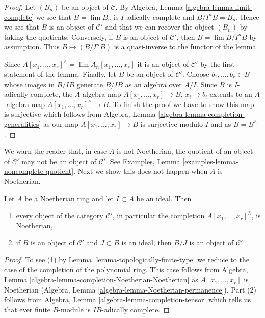 \begin{proof}
Let $(B_n)$ be an object of $\mathcal{C}$. By
Algebra, Lemma \ref{algebra-lemma-limit-complete}
we see that $B = \lim B_n$ is $I$-adically complete
and $B/I^nB = B_n$. Hence we see that $B$ is an object of
$\mathcal{C}'$ and that we can recover the object $(B_n)$ 
by taking the quotients.
Conversely, if $B$ is an object of $\mathcal{C}'$, then
$B = \lim B/I^nB$ by assumption. Thus $B \mapsto (B/I^nB)$ is a quasi-inverse
to the functor of the lemma.

\medskip\noindent
Since $A[x_1, \ldots, x_r]^\wedge = \lim A_n[x_1, \ldots, x_r]$
it is an object of $\mathcal{C}'$ by the first statement of the lemma.
Finally, let $B$ be an object of $\mathcal{C}'$. Choose
$b_1, \ldots, b_r \in B$ whose images in $B/IB$ generate
$B/IB$ as an algebra over $A/I$. Since $B$ is $I$-adically
complete, the $A$-algebra map $A[x_1, \ldots, x_r] \to B$, $x_i \mapsto b_i$
extends to an $A$-algebra map $A[x_1, \ldots, x_r]^\wedge \to B$.
To finish the proof we have to show this map is surjective
which follows from Algebra, Lemma \ref{algebra-lemma-completion-generalities}
as our map $A[x_1, \ldots, x_r] \to B$ is surjective modulo $I$
and as $B = B^\wedge$.
\end{proof}

\noindent
We warn the reader that, in case $A$ is not Noetherian, the
quotient of an object of $\mathcal{C}'$ may not be an object
of $\mathcal{C}'$. See Examples, Lemma
\ref{examples-lemma-noncomplete-quotient}.
Next we show this does not happen when $A$ is Noetherian.

\begin{lemma}
\label{lemma-topologically-finite-type-Noetherian}
\begin{reference}
\cite[Proposition 7.5.5]{EGA1}
\end{reference}
Let $A$ be a Noetherian ring and let $I \subset A$ be an ideal. Then
\begin{enumerate}
\item every object of the category $\mathcal{C}'$, in particular the
completion $A[x_1, \ldots, x_r]^\wedge$, is Noetherian,
\item if $B$ is an object of $\mathcal{C}'$ and $J \subset B$ is an
ideal, then $B/J$ is an object of $\mathcal{C}'$.
\end{enumerate}
\end{lemma}

\begin{proof}
To see (1) by Lemma \ref{lemma-topologically-finite-type}
we reduce to the case of the completion of the polynomial ring.
This case follows from
Algebra, Lemma \ref{algebra-lemma-completion-Noetherian-Noetherian}
as $A[x_1, \ldots, x_r]$ is Noetherian
(Algebra, Lemma \ref{algebra-lemma-Noetherian-permanence}).
Part (2) follows from Algebra, Lemma \ref{algebra-lemma-completion-tensor}
which tells us that ever finite $B$-module is
$IB$-adically complete.
\end{proof}


